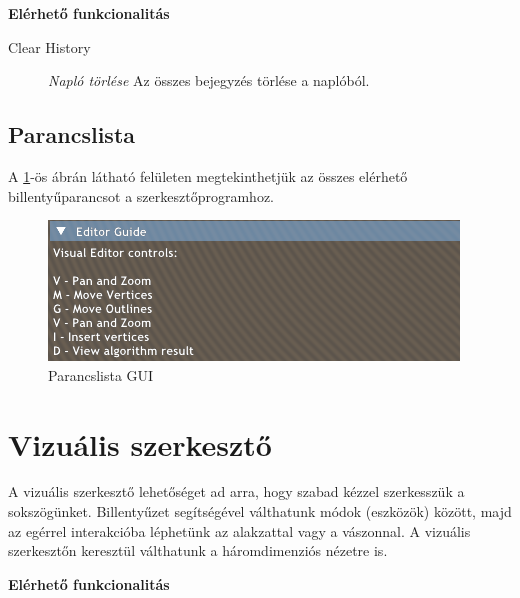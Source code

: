\textbf{Elérhető funkcionalitás}

\begin{description}
    \item[Clear History] \textit{Napló törlése} Az összes bejegyzés törlése a naplóból.
\end{description}

\subsection{Parancslista}

A \ref{fig:user_guide-1}-ös ábrán látható felületen megtekinthetjük az összes elérhető billentyűparancsot a szerkesztőprogramhoz.

\begin{figure}[H]
    \centering
    \includegraphics[width=1\linewidth]{images/user_guide.png}
    \caption{Parancslista GUI}
    \label{fig:user_guide-1}
\end{figure}


\section{Vizuális szerkesztő}\label{sec:visual_editor}

A vizuális szerkesztő lehetőséget ad arra, hogy szabad kézzel szerkesszük a sokszögünket. Billentyűzet segítségével válthatunk módok (eszközök) között, majd az egérrel interakcióba léphetünk az alakzattal vagy a vászonnal. A vizuális szerkesztőn keresztül válthatunk a háromdimenziós nézetre is.

\textbf{Elérhető funkcionalitás}

